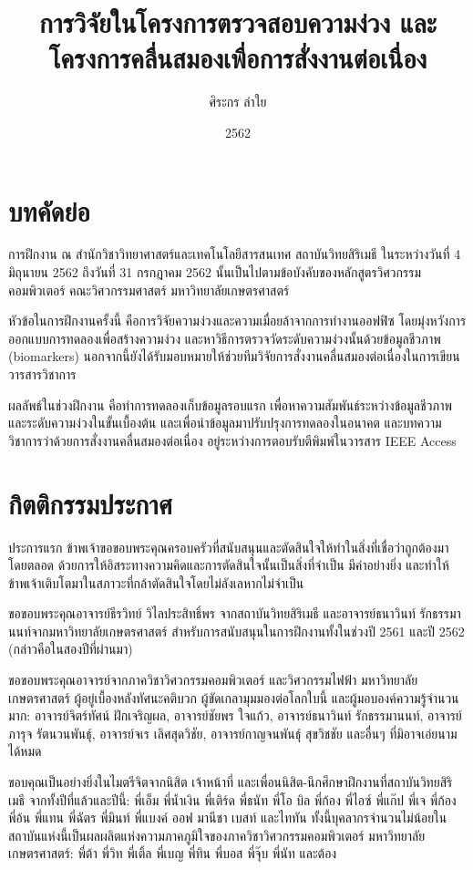\documentclass[16pt,a4]{internshipreport}
\title{การวิจัยในโครงการตรวจสอบความง่วง และโครงการคลื่นสมองเพื่อการสั่งงานต่อเนื่อง}
\date{2562}
\author{ศิระกร ลำใย}
\begin{document}
\maketitle

\chapter*{บทคัดย่อ}

การฝึกงาน ณ สำนักวิชาวิทยาศาสตร์และเทคโนโลยีสารสนเทศ สถาบันวิทยสิริเมธี ในระหว่างวันที่ 4 มิถุนายน 2562 ถึงวันที่ 31 กรกฎาคม 2562 นั้นเป็นไปตามข้อบังคับของหลักสูตรวิศวกรรมคอมพิวเตอร์ คณะวิศวกรรมศาสตร์ มหาวิทยาลัยเกษตรศาสตร์

หัวข้อในการฝึกงานครั้งนี้ คือการวิจัยความง่วงและความเมื่อยล้าจากการทำงานออฟฟิซ โดยมุ่งหวังการออกแบบการทดลองเพื่อสร้างความง่วง และหาวิธีการตรวจวัดระดับความง่วงนั้นด้วยข้อมูลชีวภาพ (biomarkers) นอกจากนี้ยังได้รับมอบหมายให้ช่วยทีมวิจัยการสั่งงานคลื่นสมองต่อเนื่องในการเขียนวารสารวิชาการ

ผลลัพธ์ในช่วงฝึกงาน คือทำการทดลองเก็บข้อมูลรอบแรก เพื่อหาความสัมพันธ์ระหว่างข้อมูลชีวภาพและระดับความง่วงในขั้นเบื้องต้น และเพื่อนำข้อมูลมาปรับปรุงการทดลองในอนาคต และบทความวิชาการว่าด้วยการสั่งงานคลื่นสมองต่อเนื่อง อยู่ระหว่างการตอบรับตีพิมพ์ในวารสาร IEEE Access

\chapter*{กิตติกรรมประกาศ}
ประการแรก ข้าพเจ้าขอขอบพระคุณครอบครัวที่สนับสนุนและตัดสินใจให้ทำในสิ่งที่เชื่อว่าถูกต้องมาโดยตลอด ด้วยการให้อิสระทางความคิดและการตัดสินใจนั้นเป็นสิ่งที่จำเป็น มีค่าอย่างยิ่ง และทำให้ข้าพเจ้าเติบโตมาในสภาวะที่กล้าตัดสินใจโดยไม่ลังเลหากไม่จำเป็น

ขอขอบพระคุณอาจารย์ธีรวิทย์ วิไลประสิทธิ์พร จากสถาบันวิทยสิริเมธี และอาจารย์ธนาวินท์ รักธรรมานนท์จากมหาวิทยาลัยเกษตรศาสตร์ สำหรับการสนับสนุนในการฝึกงานทั้งในช่วงปี 2561 และปี 2562 (กล่าวคือในสองปีที่ผ่านมา)

ขอขอบพระคุณอาจารย์จากภาควิชาวิศวกรรมคอมพิวเตอร์ และวิศวกรรมไฟฟ้า มหาวิทยาลัยเกษตรศาสตร์ ผู้อยู่เบื้องหลังทัศนะคติบวก ผู้ขัดเกลามุมมองต่อโลกใบนี้ และผู้มอบองค์ความรู้จำนวนมาก: อาจารย์จิตร์ทัศน์ ฝักเจริญผล, อาจารย์ชัยพร ใจแก้ว, อาจารย์ธนาวินท์ รักธรรมานนท์, อาจารย์ภารุจ รัตนวนพันธุ์, อาจารย์จเร เลิศสุดวิชัย, อาจารย์กาญจนพันธุ์ สุขวิชชัย และอื่นๆ ที่มิอาจเอ่ยนามได้หมด

ขอบคุณเป็นอย่างยิ่งในไมตรีจิตจากนิสิต เจ้าหน้าที่ และเพื่อนนิสิต-นึกศึกษาฝึกงานที่สถาบันวิทยสิริเมธี จากทั้งปีที่แล้วและปีนี้: พี่เอ็ม พี่น้ำเงิน พี่เติร์ด พี่ธนัท  พี่โอ บิล พี่ก้อง พี่ไอซ์ พี่แก๊ป พี่เจ พี่ก้อง พี่อ้น พี่แทน พี่ฉัตร พี่มินท์ พี่แบงค์ ออฟ มานีชา เบสท์ และไททัน ทั้งนี้บุคลากรจำนวนไม่น้อยในสถาบันแห่งนี้เป็นผลผลิตแห่งความภาคภูมิใจของภาควิชาวิศวกรรมคอมพิวเตอร์ มหาวิทยาลัยเกษตรศาสตร์: พี่ต้า พี่วิท พี่เติ้ล พี่เบญ พี่ทิน พี่บอส พี่จุ๊บ พี่นัท และต้อง
\end{document}
